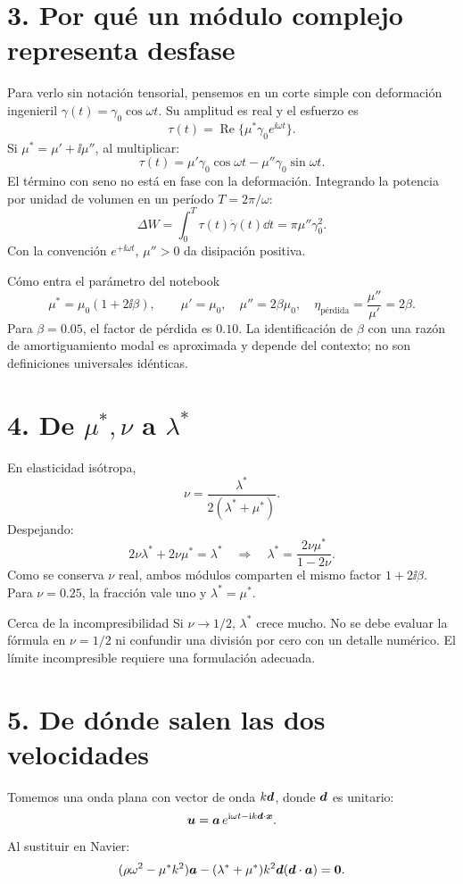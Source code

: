 \documentclass[11pt]{article}
\begin{document}
\section*{3. Por qué un módulo complejo representa desfase}
Para verlo sin notación tensorial, pensemos en un corte simple con
deformación ingenieril \(\gamma(t)=\gamma_0\cos\omega t\). Su amplitud es real
y el esfuerzo es
\[
 \tau(t)=\operatorname{Re}\{\mu^*\gamma_0e^{\ii\omega t}\}.
\]
Si \(\mu^*=\mu'+\ii\mu''\), al multiplicar:
\[
 \tau(t)=\mu'\gamma_0\cos\omega t-\mu''\gamma_0\sin\omega t.
\]
El término con seno no está en fase con la deformación. Integrando la potencia
por unidad de volumen en un período \(T=2\pi/\omega\):
\[
 \Delta W=\int_0^T\tau(t)\dot\gamma(t)\dd t
          =\pi\mu''\gamma_0^2.
\]
Con la convención \(e^{+\ii\omega t}\), \(\mu''>0\) da disipación positiva.

\begin{resultado}{Cómo entra el parámetro del notebook}
\[
 \mu^*=\mu_0(1+2\ii\beta),\qquad
 \mu'=\mu_0,\quad\mu''=2\beta\mu_0,\quad
 \eta_{\text{pérdida}}=\frac{\mu''}{\mu'}=2\beta.
\]
Para \(\beta=0.05\), el factor de pérdida es \(0.10\).
La identificación de \(\beta\) con una razón de amortiguamiento modal es
aproximada y depende del contexto; no son definiciones universales idénticas.
\end{resultado}

\section*{4. De \(\mu^*,\nu\) a \(\lambda^*\)}
En elasticidad isótropa,
\[
 \nu=\frac{\lambda^*}{2(\lambda^*+\mu^*)}.
\]
Despejando:
\[
 2\nu\lambda^*+2\nu\mu^*=\lambda^*
 \quad\Longrightarrow\quad
 \boxed{\lambda^*=\frac{2\nu\mu^*}{1-2\nu}.}
\]
Como se conserva \(\nu\) real, ambos módulos comparten el mismo factor
\(1+2\ii\beta\). Para \(\nu=0.25\), la fracción vale uno y
\(\lambda^*=\mu^*\).

\begin{alerta}{Cerca de la incompresibilidad}
Si \(\nu\to1/2\), \(\lambda^*\) crece mucho. No se debe evaluar la fórmula en
\(\nu=1/2\) ni confundir una división por cero con un detalle numérico.
El límite incompresible requiere una formulación adecuada.
\end{alerta}

\newpage
\section*{5. De dónde salen las dos velocidades}
Tomemos una onda plana con vector de onda \(k\bm{d}\), donde \(\bm{d}\) es
unitario:
\[
 \bm{u}=\bm{a}\,e^{\mathrm{i}\omega t-\mathrm{i} k\bm{d}\cdot\bm{x}}.
\]
Al sustituir en Navier:
\[
 (\rho\omega^2-\mu^*k^2)\bm{a}
 -(\lambda^*+\mu^*)k^2\bm{d}(\bm{d}\cdot\bm{a})=\bm{0}.
\]
\end{document}
